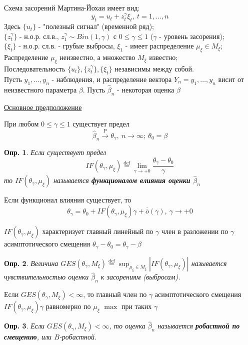 \documentclass[12pt]{article}
\newtheorem{definition}{Опр.}
\theoremstyle{basic_theorem}
\theoremstyle{name_theorem}
\newcommand\defin[1]{\textbf{#1}}
\newcommand*{\defeq}{\stackrel{\text{def}}{=}}
\def\P{ \mathrm{P} }
\def\littleO{ \overline{\overline{o}} }
\begin{document}
Схема засорений Мартина-Йохаи имеет вид:
\[y_t = u_t + z^\gamma_t\xi_t,\ t = 1, \ldots, n\]
Здесь $\{u_t\}$ - "полезный сигнал" (временной ряд); \\
$\{z_t^\gamma\}$ - н.о.р. сл.в., $z_1^{\gamma} \sim Bin(1, \gamma)$
с $0 \leq \gamma\leq1$ ($\gamma$ - уровень засорения); \\
$\{\xi_t\}$ - н.о.р. сл.в. - грубые выбросы, $\xi_1$ - имеет распределение
$\mu_\xi\in M_\xi$;
Распределение $\mu_\xi$ неизвестно, а множество $M_\xi$ известно; \\
Последовательность $\{u_t\}, \{z^\gamma_t\}, \{\xi_t\}$ независимы между собой. \\
Пусть $y_1, \ldots, y_n$ - наблюдения, и распределение
вектора $Y_n=y_1, \ldots, y_n$ висит от неизвестного параметра $\beta$.
Пусть $\hat{\beta}_n$ - некоторая оценка $\beta$

\underline{Основное предположение}

При любом $0 \leq \gamma\leq1$ существует предел
\[\hat{\beta}_n\xrightarrow{\P}\theta_\gamma,\ n\rightarrow\infty;\ \theta_0=\beta\]

\begin{definition}
    Если существует предел
    \[IF(\theta_\gamma, \mu_\xi)\defeq\lim_{\gamma\rightarrow+0}\frac{\theta_\gamma-\theta_0}{\gamma}\]
    то $IF(\theta_\gamma, \mu_\xi)$ называется \defin{функционалом влияния оценки $\widehat{\beta}_n$}
\end{definition}

Если функционал влияния существует, то 
\[\theta_\gamma = \theta_0 + IF(\theta_\gamma, \mu_\xi)\gamma + \littleO(\gamma),\ \gamma\rightarrow+0\]
\begin{leftbar}
    $IF(\theta_\gamma, \mu_\xi)$ характеризует главный линейный по
    $\gamma$ член в разложении по $\gamma$ асимптотического смещения $\theta_\gamma - \theta_0=\theta_\gamma-\beta$
\end{leftbar}

\begin{definition}
    Величина $GES(\theta_\gamma,M_\xi)\defeq\sup_{\mu_\xi\in M_\xi}\left\lvert IF(\theta_\gamma, \mu_\xi)\right\rvert$
    называется чувствительностью оценки $\widehat{\beta}_n$ к засорениям (выбросам).
\end{definition}
\begin{leftbar}
    Если $GES(\theta_\gamma,M_\xi)<\infty$, то главный член по $\gamma$
    асимптотического смещения $IF(\theta_\gamma,\mu_\xi)\gamma$
    равномерно по $\mu_\xi$ $\max$ при таких $\gamma$
\end{leftbar}
\begin{definition}
    Если $GES(\theta_\gamma,M_\xi)<\infty$, то оценка $\widehat{\beta}_n$
    называется \defin{робастной по смещению}, или $B$-робастной.
\end{definition}
\end{document}
